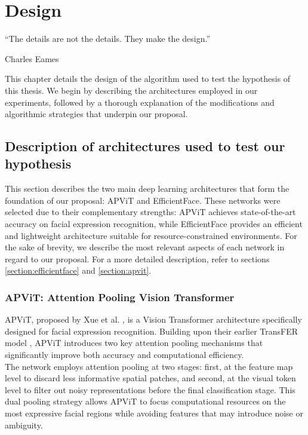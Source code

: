 \chapter{Design}
\epigraph{``The details are not the details. They make the design.''}{\vspace{10pt}Charles Eames}
\label{chapter:design}
\newpage

This chapter details the design of the algorithm used to test the hypothesis of this thesis. We begin by describing the architectures employed in our experiments, followed by a thorough explanation of the modifications and algorithmic strategies that underpin our proposal.

\section{Description of architectures used to test our hypothesis}

This section describes the two main deep learning architectures that form the foundation of our proposal: APViT and EfficientFace. These networks were selected due to their complementary strengths: APViT achieves state-of-the-art accuracy on facial expression recognition, while EfficientFace provides an efficient and lightweight architecture suitable for resource-constrained environments. For the sake of brevity, we describe the most relevant aspects of each network in regard to our proposal. For a more detailed description, refer to sections \ref{section:efficientface} and \ref{section:apvit}.

\subsection{APViT: Attention Pooling Vision Transformer}

APViT, proposed by Xue et al. \cite{apvit2023}, is a Vision Transformer architecture specifically designed for facial expression recognition. Building upon their earlier TransFER model \cite{xue2021transfer}, APViT introduces two key attention pooling mechanisms that significantly improve both accuracy and computational efficiency.\\

The network employs attention pooling at two stages: first, at the feature map level to discard less informative spatial patches, and second, at the visual token level to filter out noisy representations before the final classification stage. This dual pooling strategy allows APViT to focus computational resources on the most expressive facial regions while avoiding features that may introduce noise or ambiguity.\\


